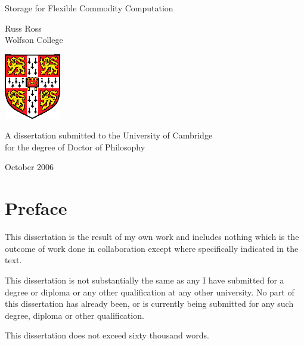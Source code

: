 
\pagestyle{empty}
\begin{titlepage}
\begin{center}
\vspace*{\fill}

\huge
Storage for Flexible Commodity Computation

\vfill
\vfill

\huge
Russ Ross\\[6mm]
\large
Wolfson College

\vfill
\includegraphics[width=70pt]{eps/camshield}
\vfill

\large
A dissertation submitted to the University of Cambridge\\
for the degree of Doctor of Philosophy

\vfill

October 2006

\vspace*{\fill}
\end{center}
\end{titlepage}
\cleardoublepage



\chapter*{Preface}

\noindent This dissertation is the result of my own work and includes nothing which is the outcome of work done in collaboration except where specifically indicated in the text.

\noindent This dissertation is not substantially the same as any I have submitted for a degree or diploma or any other qualification at any other university. No part of this dissertation has already been, or is currently being submitted for any such degree, diploma or other qualification.

\noindent This dissertation does not exceed sixty thousand words.

